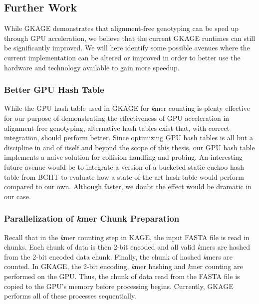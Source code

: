 \subsection{Further Work}
While GKAGE demonstrates that alignment-free genotyping can be sped up through GPU acceleration, we believe that the current GKAGE runtimes can still be significantly improved.
We will here identify some possible avenues where the current implementation can be altered or improved in order to better use the hardware and technology available to gain more speedup.

\subsubsection{Better GPU Hash Table}
While the GPU hash table used in GKAGE for \textit{k}mer counting is plenty effective for our purpose of demonstrating the effectiveness of GPU acceleration in alignment-free genotyping, alternative hash tables exist that, with correct integration, should perform better.
Since optimizing GPU hash tables is all but a discipline in and of itself and beyond the scope of this thesis, our GPU hash table implements a naive solution for collision handling and probing.
An interesting future avenue would be to integrate a version of a bucketed static cuckoo hash table from BGHT \cite{bght} to evaluate how a state-of-the-art hash table would perform compared to our own.
Although faster, we doubt the effect would be dramatic in our case.

\subsubsection{Parallelization of \textit{k}mer Chunk Preparation}
Recall that in the \textit{k}mer counting step in KAGE, the input FASTA file is read in chunks.
Each chunk of data is then 2-bit encoded and all valid \textit{k}mers are hashed from the 2-bit encoded data chunk.
Finally, the chunk of hashed \textit{k}mers are counted.
In GKAGE, the 2-bit encoding, \textit{k}mer hashing and \textit{k}mer counting are performed on the GPU.
Thus, the chunk of data read from the FASTA file is copied to the GPU's memory before processing begins.
Currently, GKAGE performs all of these processes sequentially.

